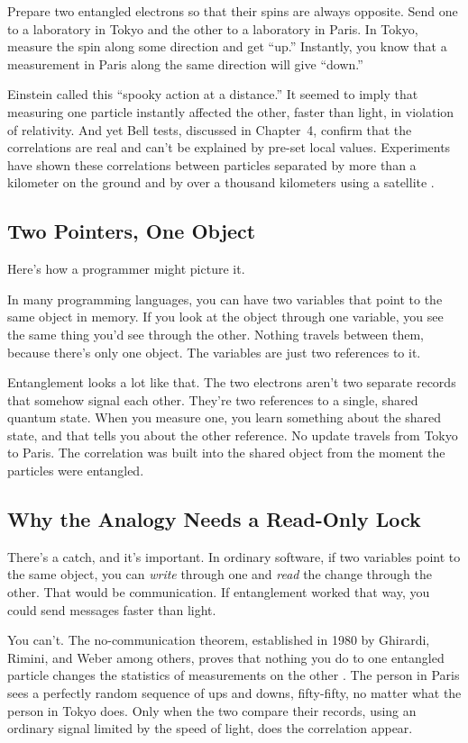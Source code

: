 Prepare two entangled electrons so that their spins are always opposite. Send one to a laboratory in Tokyo and the other to a laboratory in Paris. In Tokyo, measure the spin along some direction and get ``up.'' Instantly, you know that a measurement in Paris along the same direction will give ``down.''

Einstein called this ``spooky action at a distance.'' It seemed to imply that measuring one particle instantly affected the other, faster than light, in violation of relativity. And yet Bell tests, discussed in Chapter~4, confirm that the correlations are real and can't be explained by pre-set local values. Experiments have shown these correlations between particles separated by more than a kilometer on the ground \cite{hensen2015} and by over a thousand kilometers using a satellite \cite{yin2017}.

\subsection{Two Pointers, One Object}

Here's how a programmer might picture it.

In many programming languages, you can have two variables that point to the same object in memory. If you look at the object through one variable, you see the same thing you'd see through the other. Nothing travels between them, because there's only one object. The variables are just two references to it.

Entanglement looks a lot like that. The two electrons aren't two separate records that somehow signal each other. They're two references to a single, shared quantum state. When you measure one, you learn something about the shared state, and that tells you about the other reference. No update travels from Tokyo to Paris. The correlation was built into the shared object from the moment the particles were entangled.

\subsection{Why the Analogy Needs a Read-Only Lock}

There's a catch, and it's important. In ordinary software, if two variables point to the same object, you can \emph{write} through one and \emph{read} the change through the other. That would be communication. If entanglement worked that way, you could send messages faster than light.

You can't. The no-communication theorem, established in 1980 by Ghirardi, Rimini, and Weber among others, proves that nothing you do to one entangled particle changes the statistics of measurements on the other \cite{ghirardi1980}. The person in Paris sees a perfectly random sequence of ups and downs, fifty-fifty, no matter what the person in Tokyo does. Only when the two compare their records, using an ordinary signal limited by the speed of light, does the correlation appear.

